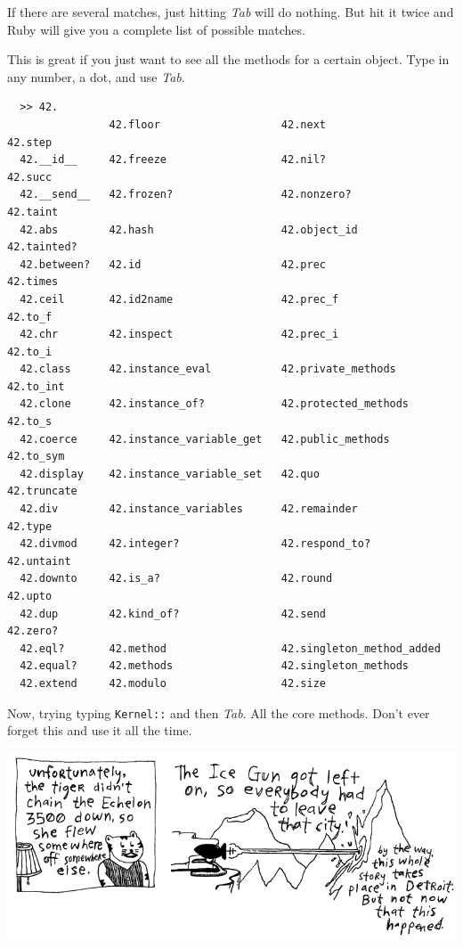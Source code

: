 \documentclass[10pt,twoside]{report}
\begin{document}
If there are several matches, just hitting \emph{Tab} will do nothing. But
hit it twice and Ruby will give you a complete list of possible
matches.

This is great if you just want to see all the methods for a certain
object. Type in any number, a dot, and use \emph{Tab}.

\begin{lstlisting}
  >> 42.
                42.floor                   42.next                    42.step
  42.__id__     42.freeze                  42.nil?                    42.succ
  42.__send__   42.frozen?                 42.nonzero?                42.taint
  42.abs        42.hash                    42.object_id               42.tainted?
  42.between?   42.id                      42.prec                    42.times
  42.ceil       42.id2name                 42.prec_f                  42.to_f
  42.chr        42.inspect                 42.prec_i                  42.to_i
  42.class      42.instance_eval           42.private_methods         42.to_int
  42.clone      42.instance_of?            42.protected_methods       42.to_s
  42.coerce     42.instance_variable_get   42.public_methods          42.to_sym
  42.display    42.instance_variable_set   42.quo                     42.truncate
  42.div        42.instance_variables      42.remainder               42.type
  42.divmod     42.integer?                42.respond_to?             42.untaint
  42.downto     42.is_a?                   42.round                   42.upto
  42.dup        42.kind_of?                42.send                    42.zero?
  42.eql?       42.method                  42.singleton_method_added  
  42.equal?     42.methods                 42.singleton_methods       
  42.extend     42.modulo                  42.size  
\end{lstlisting}

Now, trying typing \lstinline[breaklines=false]|Kernel::| and then
\emph{Tab}. All the core methods. Don't ever forget this and use it
all the time.

\includegraphics[width=1.0\textwidth]{cache/tigersvest3.png} 
\end{document}
